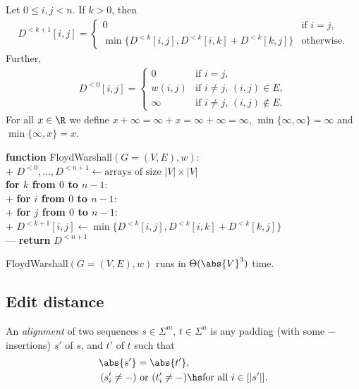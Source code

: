 \documentclass{article}
\begin{document}
\begin{theorem}[L18]
	Let $0\leq i,j<n$. If $k>0$, then 
	\begin{align*}
		D^{<k+1}[i,j]=\begin{cases}
			0 & \text{if $i=j$}, \\
			\min\{D^{<k}[i,j],D^{<k}[i,k]+D^{<k}[k,j]\} & \text{otherwise}.
		\end{cases}
	\end{align*}
	Further,
	\begin{align*}
		D^{<0}[i,j] = \begin{cases}
			0 		& \text{if $i=j$}, \\
			w(i,j)  & \text{if $i\not=j$, $(i,j)\in E$}, \\
			\infty  & \text{if $i\not=j$, $(i,j)\not\in E$}.
		\end{cases}
	\end{align*}
	For all $x\in\R$ we define $x+\infty = \infty + x = \infty + \infty = \infty$,
	$\min\{\infty, \infty\}=\infty$ and $\min\{\infty, x\}=x$.
\end{theorem}

\begin{pseudo}
\textbf{function} \textsf{FloydWarshall}$(G=(V,E), w)$:\\+
	$D^{<0}, ..., D^{<n+1}\leftarrow \text{arrays of size $|V|\times |V|$}$	\\
	\textbf{for $k$ from $0$ to $n-1$}:										\\+
		\textbf{for $i$ from $0$ to $n-1$}:									\\+
			\textbf{for $j$ from $0$ to $n-1$}: 							\\+
				$D^{<k+1}[i,j]\leftarrow \min
					\{D^{<k}[i,j],D^{<k}[i,k]+D^{<k}[k,j]\}$				\\---
	\textbf{return} $D^{<n+1}$
\end{pseudo}

\begin{theorem}
	\textsf{FloydWarshall}$(G=(V,E), w)$ runs in $\Theta(\abs{V}^3)$ time.
\end{theorem}

\subsection{Edit distance}

\begin{definition}
	An \emph{alignment} of two sequences $s\in\Sigma^m$, $t\in\Sigma^n$ is
	any padding (with some $-$ insertions) $s'$ of $s$, and $t'$ of $t$ such that
	\begin{align*}
		\abs{s'}&=\abs{t'},\\
		(s'_i\not=-)&\text{ or }(t'_i\not=-)\hs\text{for all }i\in[|s'|].
	\end{align*}
\end{definition}
\end{document}
